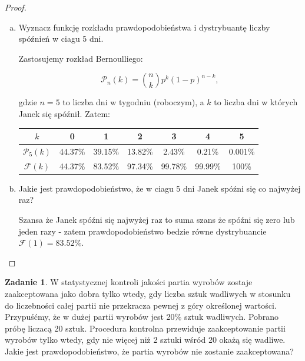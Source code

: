 \documentclass[11pt]{article}
\theoremstyle{definition}
\newtheorem{zadanie}{Zadanie}
\numberwithin{zadanie}{section}
\begin{document}
\begin{proof}

    \begin{enumerate}[a)]
        \item Wyznacz funkcję rozkładu prawdopodobieństwa i dystrybuantę liczby spóźnień w ciagu 5 dni.

              Zastosujemy rozkład Bernoulliego:

              $$\mathcal P_n(k) = \binom nkp^k(1-p)^{n-k},$$

              gdzie $n=5$ to liczba dni w tygodniu (roboczym), a $k$ to liczba dni w których Janek się spóźnił. Zatem:


              \begin{center}
                  \begin{tabular}{ |c|c|c|c|c|c|c| }
                      \hline
                      $k$               & 0       & 1       & 2       & 3       & 4       & 5       \\
                      \hline
                      $\mathcal P_5(k)$ & 44.37\% & 39.15\% & 13.82\% & 2.43\%  & 0.21\%  & 0.001\% \\
                      \hline
                      $\mathcal F(k)$   & 44.37\% & 83.52\% & 97.34\% & 99.78\% & 99.99\% & 100\%   \\
                      \hline
                  \end{tabular}
              \end{center}



        \item Jakie jest prawdopodobieństwo, że w ciagu 5 dni Janek spóźni się co najwyżej raz?

              Szansa że Janek spóźni się najwyżej raz to suma szans że spóźni się zero lub jeden razy - zatem prawdopodobieństwo bedzie równe dystrybuancie $\mathcal F(1)=83.52\%$.

    \end{enumerate}
\end{proof}
\begin{zadanie}
    W statystycznej kontroli jakości partia wyrobów zostaje zaakceptowana jako dobra tylko wtedy, gdy liczba sztuk
    wadliwych w stosunku do liczebności całej partii nie przekracza pewnej z góry określonej wartości. Przypuśćmy, że
    w dużej partii wyrobów jest 20\% sztuk wadliwych. Pobrano próbę liczacą 20 sztuk. Procedura kontrolna przewiduje
    zaakceptowanie partii wyrobów tylko wtedy, gdy nie więcej niż 2 sztuki wśród 20 okażą się wadliwe. Jakie jest
    prawdopodobieństwo, że partia wyrobów nie zostanie zaakceptowana?
\end{zadanie}
\end{document}
